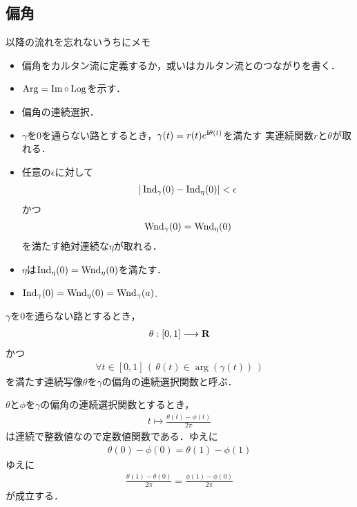\subsection{偏角}
	\begin{itembox}[l]{以降の流れを忘れないうちにメモ}
		\begin{itemize}
			\item 偏角をカルタン流に定義するか，或いはカルタン流とのつながりを書く．
			\item $\operatorname{Arg} = \operatorname{Im} \circ \operatorname{Log}$を示す．
			\item 偏角の連続選択．
			\item $\gamma$を$0$を通らない路とするとき，$\gamma(t) = r(t) e^{\mathbf{i} \theta(t)}$を満たす
				実連続関数$r$と$\theta$が取れる．
			\item 任意の$\epsilon$に対して
				\begin{align}
					|\operatorname{Ind}_{\gamma}(0) - \operatorname{Ind}_{\eta}(0)| < \epsilon
				\end{align}
				かつ
				\begin{align}
					\operatorname{Wnd}_{\gamma}(0) = \operatorname{Wnd}_{\eta}(0)
				\end{align}
				を満たす絶対連続な$\eta$が取れる．
			\item $\eta$は$\operatorname{Ind}_{\eta}(0) = \operatorname{Wnd}_{\eta}(0)$を満たす．
			\item $\operatorname{Ind}_\gamma(0) = \operatorname{Wnd}_{\eta}(0) = \operatorname{Wnd}_{\gamma}(a)$.
		\end{itemize}
	\end{itembox}
	
	$\gamma$を$0$を通らない路とするとき，
	\begin{align}
		\theta:[0,1] \longrightarrow \mathbf{R}
	\end{align}
	かつ
	\begin{align}
		\forall t \in [0,1]\, \left(\, \theta(t) \in \arg{(\gamma(t))}\, \right)
	\end{align}
	を満たす連続写像$\theta$を$\gamma$の偏角の連続選択関数と呼ぶ．
	
	$\theta$と$\phi$を$\gamma$の偏角の連続選択関数とするとき，
	\begin{align}
		t \longmapsto \frac{\theta(t) - \phi(t)}{2\pi}
	\end{align}
	は連続で整数値なので定数値関数である．ゆえに
	\begin{align}
		\theta(0) - \phi(0) = \theta(1) - \phi(1)
	\end{align}
	ゆえに
	\begin{align}
		\frac{\theta(1) - \theta(0)}{2\pi} = \frac{\phi(1) - \phi(0)}{2\pi}
	\end{align}
	が成立する．
	
